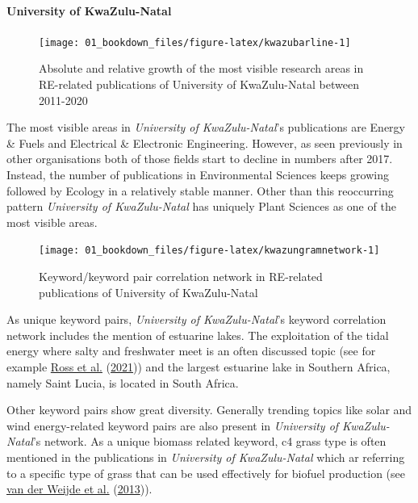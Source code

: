 \documentclass[
]{book}
\begin{document}
\hypertarget{university-of-kwazulu-natal}{%
\paragraph{University of KwaZulu-Natal}\label{university-of-kwazulu-natal}}

\begin{figure}
\texttt{[image: 01\_bookdown\_files/figure-latex/kwazubarline-1]} \caption{Absolute and relative growth of the most visible research areas in RE-related publications of University of KwaZulu-Natal between 2011-2020}\label{fig:kwazubarline}
\end{figure}

The most visible areas in \emph{University of KwaZulu-Natal}'s publications are Energy \& Fuels and Electrical \& Electronic Engineering. However, as seen previously in other organisations both of those fields start to decline in numbers after 2017. Instead, the number of publications in Environmental Sciences keeps growing followed by Ecology in a relatively stable manner. Other than this reoccurring pattern \emph{University of KwaZulu-Natal} has uniquely Plant Sciences as one of the most visible areas.

\begin{figure}
\texttt{[image: 01\_bookdown\_files/figure-latex/kwazungramnetwork-1]} \caption{Keyword/keyword pair correlation network in RE-related publications of University of KwaZulu-Natal}\label{fig:kwazungramnetwork}
\end{figure}

As unique keyword pairs, \emph{University of KwaZulu-Natal}'s keyword correlation network includes the mention of estuarine lakes. The exploitation of the tidal energy where salty and freshwater meet is an often discussed topic (see for example \protect\hyperlink{ref-ross2021}{Ross et al.} (\protect\hyperlink{ref-ross2021}{2021})) and the largest estuarine lake in Southern Africa, namely Saint Lucia, is located in South Africa.

Other keyword pairs show great diversity. Generally trending topics like solar and wind energy-related keyword pairs are also present in \emph{University of KwaZulu-Natal}'s network. As a unique biomass related keyword, c4 grass type is often mentioned in the publications in \emph{University of KwaZulu-Natal} which ar referring to a specific type of grass that can be used effectively for biofuel production (see \protect\hyperlink{ref-vanderweijde2013}{van der Weijde et al.} (\protect\hyperlink{ref-vanderweijde2013}{2013})).
\end{document}
